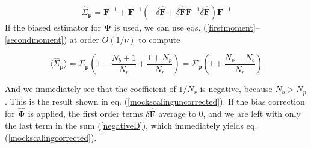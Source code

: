 \documentclass[reprint,aps,prd,superscriptaddress,showkeys,showpacs]{revtex4-1}
\newcommand{\bb}[1]{\mathbf{#1}}
\newcommand{\bbh}[1]{\mathbf{\hat{#1}}}
\newcommand{\h}[1]{\hat{#1}}
\begin{document}
\begin{equation}
\h{\Sigma}_\bb{p} = \bb{F}^{-1} + \bb{F}^{-1}\left(- \delta{\bbh{F}}+ \delta{\bbh{F}}\bb{F}^{-1}\delta{\bbh{F}}\right)\bb{F}^{-1}  
\end{equation}  
%
If the biased estimator for $\bbh{\Psi}$ is used, we can use eqs. (\ref{firstmoment}--\ref{secondmoment}) at order $O(1/\nu)$ to compute 
\begin{widetext}
\begin{equation}
\label{negativeD}
\langle\h{\Sigma}_\bb{p}\rangle = \Sigma_\bb{p}\left(1-\frac{N_b+1}{N_r}+\frac{1+N_p}{N_r}\right) = \Sigma_\bb{p}\left(1+\frac{N_p-N_b}{N_r}\right)
\end{equation}
\end{widetext}
%
And we immediately see that the coefficient of $1/N_r$ is negative, because $N_b>N_p$. This is the result shown in eq. (\ref{mockscalinguncorrected}). If the bias correction for $\bbh{\Psi}$ is applied, the first order terms $\delta{\bbh{F}}$ average to 0, and we are left with only the last term in the sum (\ref{negativeD}), which immediately yields eq. (\ref{mockscalingcorrected}). 


\label{lastpage}
\end{document}
